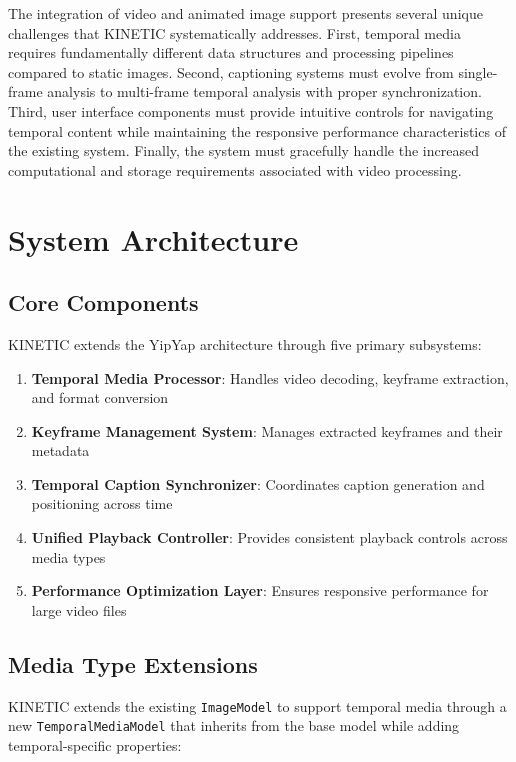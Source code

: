 \documentclass[10pt]{article}
\begin{document}
The integration of video and animated image support presents several unique challenges that KINETIC systematically addresses. First, temporal media requires fundamentally different data structures and processing pipelines compared to static images. Second, captioning systems must evolve from single-frame analysis to multi-frame temporal analysis with proper synchronization. Third, user interface components must provide intuitive controls for navigating temporal content while maintaining the responsive performance characteristics of the existing system. Finally, the system must gracefully handle the increased computational and storage requirements associated with video processing.

\section{System Architecture}

\subsection{Core Components}

KINETIC extends the YipYap architecture through five primary subsystems:

\begin{enumerate}
    \item \textbf{Temporal Media Processor}: Handles video decoding, keyframe extraction, and format conversion
    \item \textbf{Keyframe Management System}: Manages extracted keyframes and their metadata
    \item \textbf{Temporal Caption Synchronizer}: Coordinates caption generation and positioning across time
    \item \textbf{Unified Playback Controller}: Provides consistent playback controls across media types
    \item \textbf{Performance Optimization Layer}: Ensures responsive performance for large video files
\end{enumerate}

\subsection{Media Type Extensions}

KINETIC extends the existing \texttt{ImageModel} to support temporal media through a new \texttt{TemporalMediaModel} that inherits from the base model while adding temporal-specific properties:
\end{document}
